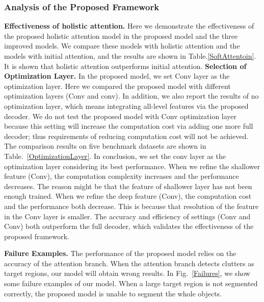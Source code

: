 \documentclass[10pt,twocolumn,letterpaper]{article}
\begin{document}
\subsubsection{Analysis of the Proposed Framework}
\noindent\textbf{Effectiveness of holistic attention.} Here we demonstrate the effectiveness of the proposed holistic attention model in the proposed model and the three improved models. We compare these models with holistic attention and the models with initial attention, and the results are shown in Table.\ref{SoftAttentoin}. It is shown that holistic attention outperforms initial attention.
\noindent\textbf{Selection of Optimization Layer.} In the proposed model, we set Conv layer as the optimization layer. Here we compared the proposed model with different optimization layers (Conv and conv). In addition, we also report the results of no optimization layer, which means integrating all-level features via the proposed decoder. We do not test the proposed model with Conv optimization layer because this setting will increase the computation cost via adding one more full decoder; thus requirements of reducing computation cost will not be achieved. The comparison results on five benchmark datasets are shown in Table.~\ref{OptimizationLayer}. In conclusion, we set the conv layer as the optimization layer considering its best performance. When we refine the shallower feature (Conv), the computation complexity increases and the performance decreases. The reason might be that the feature of shallower layer has not been enough trained. When we refine the deep feature (Conv), the computation cost and the performance both decrease. This is because that resolution of the feature in the Conv layer is smaller. The accuracy and efficiency of settings (Conv and Conv) both outperform the full decoder, which validates the effectiveness of the proposed framework.

\noindent\textbf{Failure Examples.} The performance of the proposed model relies on the accuracy of the attention branch. When the attention branch detects clutters as target regions, our model will obtain wrong results. In Fig.~\ref{Failures}, we show some failure examples of our model. When a large target region is not segmented correctly, the proposed model is unable to segment the whole objects.
\end{document}
